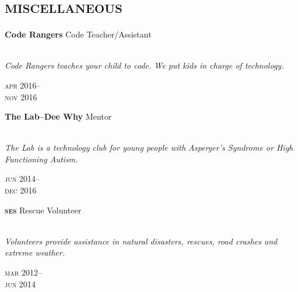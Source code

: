 

\section*{\textsc{miscellaneous}}
\vspace{-0.2cm}

\begin{minipage}[t]{0.75\textwidth}
\textbf{Code Rangers}\phantom{..} Code Teacher/Assistant \\
\\
{\small
\textit{Code Rangers teaches your child to code. We put kids in charge of technology.}
\par}
\end{minipage}
\begin{minipage}[t]{0.25\textwidth}
{
\hfill \textsc{apr} 2016--\\ 
\hspace*{0pt} \hfill \textsc{nov} 2016
\par
}
\end{minipage}

\vspace{0.2in}

\begin{minipage}[t]{0.75\textwidth}
\textbf{The Lab--Dee Why}\phantom{..} Mentor \\
\\
{\small
\textit{The Lab is a technology club for young people with Asperger’s Syndrome or High Functioning Autism.}
\par}
\end{minipage}
\begin{minipage}[t]{0.25\textwidth}
{
\hfill \textsc{jun} 2014--\\ 
\hspace*{0pt} \hfill \textsc{dec} 2016
\par
}
\end{minipage}

\vspace{0.2in}

\begin{minipage}[t]{0.75\textwidth}
\textbf{\textsc{ses}}\phantom{..} Rescue Volunteer\\
\\
{\small
\textit{Volunteers provide assistance in natural disasters, rescues, road crashes and extreme weather.}
\par}
\end{minipage}
\begin{minipage}[t]{0.25\textwidth}
{
\hfill \textsc{mar} 2012--\\ 
\hspace*{0pt} \hfill \textsc{jun} 2014
\par
}
\end{minipage}

